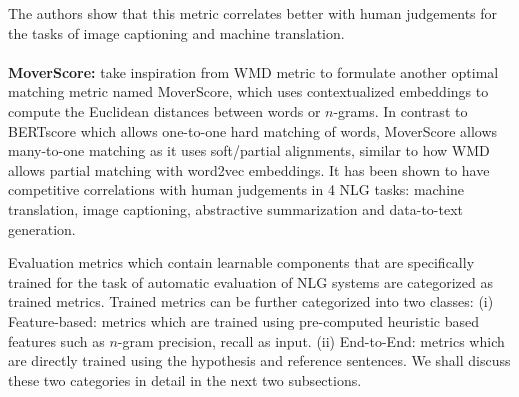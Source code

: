 The authors show that this metric correlates better with human judgements for the tasks of image captioning and machine translation.\\
\\
\textbf{MoverScore:}  take inspiration from WMD metric to formulate another optimal matching metric named MoverScore, which uses contextualized embeddings to compute the Euclidean distances between words or $n$-grams. In contrast to BERTscore which allows one-to-one hard matching of words, MoverScore allows many-to-one matching as it uses soft/partial alignments, similar to how WMD allows partial matching with word2vec embeddings.  
It has been shown to have competitive correlations with human judgements in 4 NLG tasks: machine translation, image captioning, abstractive summarization and data-to-text generation.  

Evaluation metrics which contain learnable components that are specifically trained for the task of automatic evaluation of NLG systems are categorized as trained metrics. Trained metrics can be further categorized into two classes: (i) Feature-based: metrics which are trained using pre-computed heuristic based features such as $n$-gram precision, recall as input. (ii) End-to-End: metrics which are directly trained using the hypothesis and reference sentences. We shall discuss these two categories in detail in the next two subsections.

